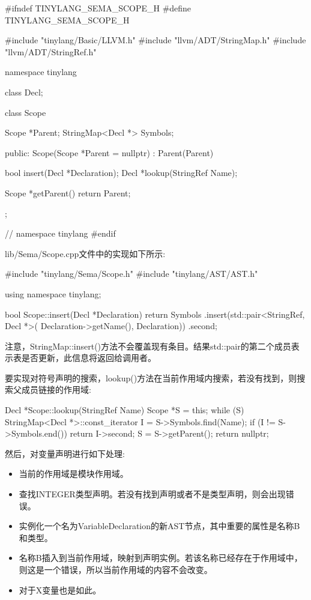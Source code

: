\begin{cpp}
#ifndef TINYLANG_SEMA_SCOPE_H
#define TINYLANG_SEMA_SCOPE_H

#include "tinylang/Basic/LLVM.h"
#include "llvm/ADT/StringMap.h"
#include "llvm/ADT/StringRef.h"

namespace tinylang {

class Decl;

class Scope {
    Scope *Parent;
    StringMap<Decl *> Symbols;

    public:
    Scope(Scope *Parent = nullptr) : Parent(Parent) {}

    bool insert(Decl *Declaration);
    Decl *lookup(StringRef Name);

    Scope *getParent() { return Parent; }
};
} // namespace tinylang
#endif
\end{cpp}

lib/Sema/Scope.cpp文件中的实现如下所示:

\begin{cpp}
#include "tinylang/Sema/Scope.h"
#include "tinylang/AST/AST.h"

using namespace tinylang;

bool Scope::insert(Decl *Declaration) {
    return Symbols
        .insert(std::pair<StringRef, Decl *>(
            Declaration->getName(), Declaration))
        .second;
}
\end{cpp}

注意，StringMap::insert()方法不会覆盖现有条目。结果std::pair的第二个成员表示表是否更新，此信息将返回给调用者。

要实现对符号声明的搜索，lookup()方法在当前作用域内搜索，若没有找到，则搜索父成员链接的作用域:

\begin{cpp}
Decl *Scope::lookup(StringRef Name) {
    Scope *S = this;
    while (S) {
        StringMap<Decl *>::const_iterator I =
        S->Symbols.find(Name);
        if (I != S->Symbols.end())
        return I->second;
        S = S->getParent();
    }
    return nullptr;
}
\end{cpp}

然后，对变量声明进行如下处理:

\begin{itemize}
\item
当前的作用域是模块作用域。

\item
查找INTEGER类型声明。若没有找到声明或者不是类型声明，则会出现错误。

\item
实例化一个名为VariableDeclaration的新AST节点，其中重要的属性是名称B和类型。

\item
名称B插入到当前作用域，映射到声明实例。若该名称已经存在于作用域中，则这是一个错误，所以当前作用域的内容不会改变。

\item
对于X变量也是如此。
\end{itemize}

